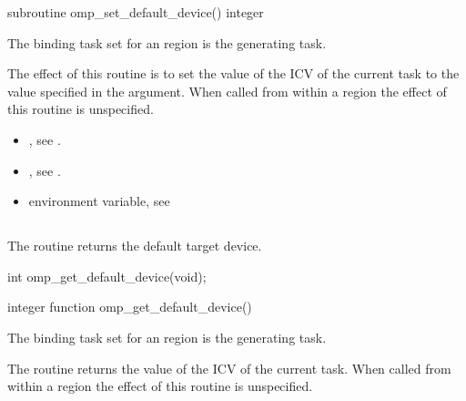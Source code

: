 \fortranspecificstart
\begin{boxedcode}
subroutine omp\_set\_default\_device()
integer 
\end{boxedcode}
\fortranspecificend

\binding
The binding task set for an  region is the generating 
task.

\effect
The effect of this routine is to set the value of the  ICV of the current 
task to the value specified in the argument. When called from within a  region 
the effect of this routine is unspecified.

\crossreferences
\begin{itemize}
\item {}, see 
.

\item {}, see 
.

\item {} environment variable, see 
\end{itemize}










\subsection{}
\label{subsec:omp_get_default_device}
\summary
The  routine returns the default target device.

\format
\ccppspecificstart
\begin{boxedcode}
int omp\_get\_default\_device(void);
\end{boxedcode}
\ccppspecificend

\fortranspecificstart
\begin{boxedcode}
integer function omp\_get\_default\_device()
\end{boxedcode}
\fortranspecificend

\binding
The binding task set for an  region is the generating 
task. 

\effect
The  routine returns the value of the  
ICV of the current task. When called from within a  region the effect of this 
routine is unspecified.

